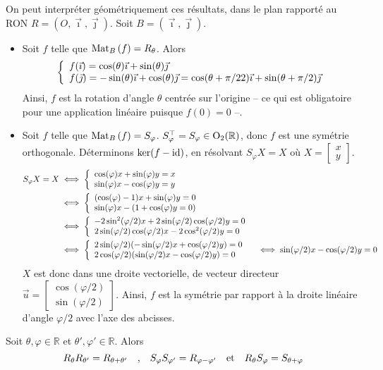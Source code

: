    On peut interpréter géométriquement ces résultats, dans le plan rapporté au RON $R = (O, \vec{\imath}, \vec{\jmath})$. Soit $B = (\vec{\imath}, \vec{\jmath})$.
    \begin{itemize}
        \item Soit $f$ telle que $\text{Mat}_{B}\left(f\right) = R_{\theta}$. Alors 
        \[ \et{f(\vec{\imath}) = \cos(\theta) \vec{\imath} + \sin(\theta) \vec{\jmath}}{f(\vec{\jmath}) = -\sin(\theta) \vec{\imath} + \cos(\theta) \vec{\jmath} = \cos(\theta + \pi /2 2) \vec{\imath} + \sin(\theta + \pi / 2) \vec{\jmath} } \]   
        Ainsi, $f$ est la rotation d’angle $\theta$ centrée sur l’origine -- ce qui est obligatoire pour une application linéaire puisque $f(0) = 0$ --.
        \item Soit $f$ telle que $\text{Mat}_{B}\left(f\right) = S_{\varphi}$. $S_{\varphi}^{\top} = S_{\varphi} \in \operatorname{O}_2(\mathbb{R})$, donc $f$ est une symétrie orthogonale. Déterminons $\ker(f - \operatorname{id})$, en résolvant $S_{\varphi} X = X$ où $X = \begin{bmatrix}
            x \\
            y
        \end{bmatrix}$. 
        \begin{align*}
            S_{\varphi} X = X 
            &\iff \et{\cos(\varphi) x + \sin(\varphi) y = x}{\sin(\varphi) x - \cos(\varphi) y = y} \\
            &\iff \et{(\cos(\varphi)-1)x + \sin(\varphi)y = 0}{\sin(\varphi)x - (1 + \cos(\varphi)y = 0)} \\
            &\iff \et{-2 \sin^2(\varphi / 2) x + 2 \sin(\varphi/2) \cos(\varphi/2) y = 0}{2 \sin(\varphi / 2)\cos(\varphi / 2)x - 2 \cos^2(\varphi/ 2)y = 0} \\
            &\iff \et{2 \sin(\varphi/2)(-\sin(\varphi/2)x + \cos(\varphi/2)y)  = 0}{2 \cos(\varphi/2)(\sin(\varphi/2)x - \cos(\varphi/2)y) = 0}
            &\iff \sin(\varphi/2)x - \cos(\varphi/2)y = 0
        \end{align*}
        $X$ est donc dans une droite vectorielle, de vecteur directeur $\vec{u} = \begin{bmatrix}
            \cos(\varphi/2) \\
            \sin(\varphi/2)
        \end{bmatrix}$. Ainsi, $f$ est la symétrie par rapport à la droite linéaire d’angle $\varphi / 2$ avec l’axe des abcisses.
    \end{itemize}

    \begin{prop}{}{}
        Soit $\theta, \varphi \in \mathbb{R}$ et $\theta', \varphi' \in \mathbb{R}$. Alors 
        \[ R_{\theta}R_{\theta'} = R_{\theta + \theta'} \quad \text{,} \quad S_{\varphi} S_{\varphi'} = R_{\varphi - \varphi'} \quad \text{et} \quad R_{\theta} S_{\varphi} = S_{\theta + \varphi} \]
    \end{prop}
    
